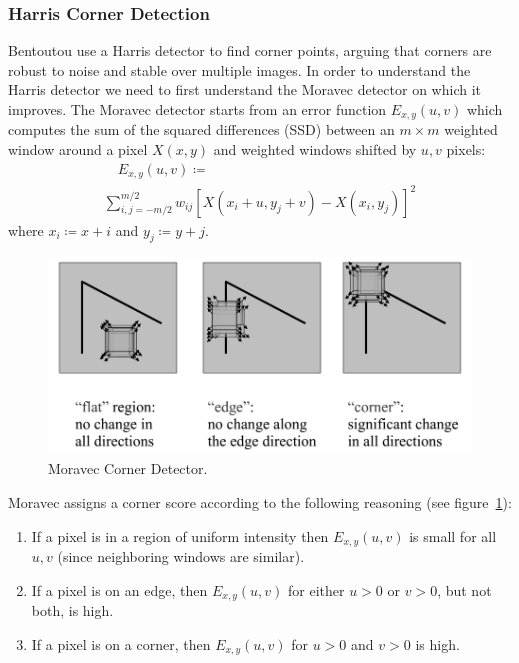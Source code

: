 \subsubsection{Harris Corner Detection}
Bentoutou \etal \cite{bentoutou2005automatic} use a Harris detector \cite{harris1988combined} to find corner points, arguing that corners are robust to noise and stable over multiple images.
%
In order to understand the Harris detector we need to first understand the Moravec \cite{moravec1980obstacle} detector on which it improves.
%
The Moravec detector starts from an error function \(E_{x,y}(u,v)\) which computes the sum of the squared differences (SSD) between an \(m \times m\) weighted window around a pixel \(X(x, y)\) and weighted windows shifted by \(u,v\) pixels:
\begin{multline}
	\quad E_{x,y}(u,v) \coloneqq \\ \sum_{i,j=-m/2}^{m/2} w_{ij}\left[ X(x_i+ u,y_j+v) - X(x_i, y_j)\right]^2
	\label{moravecerrorfunction}
\end{multline}
where \(x_i \coloneqq x + i\) and \(y_j \coloneqq y+j\).
\begin{figure}
	\centering
	\includegraphics[width=\linewidth,keepaspectratio]{figures/registration/corners.png}
	\caption{Moravec Corner Detector.}
	\label{fig:corners}
\end{figure}
Moravec assigns a corner score according to the following reasoning (see figure~\ref{fig:corners}):
\begin{framed}
	\begin{enumerate}
		\item If a pixel is in a region of uniform intensity then \(E_{x,y}(u,v)\) is small for all \(u,v\) (since neighboring windows are similar).
		\item If a pixel is on an edge, then \(E_{x,y}(u,v)\) for either \(u > 0\) or \(v > 0\), but not both, is high.
		\item If a pixel is on a corner, then \(E_{x,y}(u,v)\) for \(u > 0\) and \(v > 0\) is high.
	\end{enumerate}
\end{framed}
